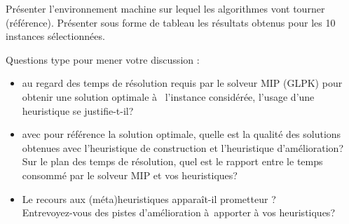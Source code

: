 \noindent
Présenter l'environnement machine sur lequel les algorithmes vont tourner (référence). 
Présenter  sous forme de tableau les résultats obtenus pour les 10 instances sélectionnées.

%
%

\vspace{5mm}
\noindent
{}
\vspace{2mm}

\noindent
Questions type pour mener votre discussion :

\begin{itemize}
\item au regard des temps de résolution requis par le solveur MIP (GLPK) pour obtenir une solution optimale à  l'instance considérée, l'usage d'une heuristique se justifie-t-il?

\item avec pour référence la solution optimale, quelle est la qualité des solutions obtenues avec l'heuristique de construction et l'heuristique d'amélioration? \\
Sur le plan des temps de résolution, quel est le rapport  entre le temps consommé par le solveur MIP et vos heuristiques?

\item Le recours aux (méta)heuristiques apparaît-il prometteur ? \\
Entrevoyez-vous des pistes d'amélioration à apporter à vos heuristiques?

\vfill
\break

\end{itemize}
